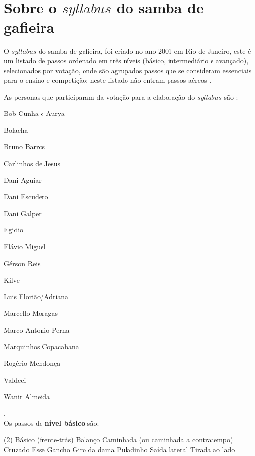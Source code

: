\section{Sobre o $syllabus$ do samba de gafieira}

O $syllabus$  do samba de gafieira, foi criado no ano 2001 em Rio de Janeiro,
este é um listado de passos ordenado em três níveis (básico, intermediário e avançado),
selecionados por votação,
onde são agrupados passos que se consideram essenciais para o ensino e competição;
neste listado não entram passos aéreos \cite[pp. 144]{perna2002samba}.


As personas que participaram da votação para a elaboração do $syllabus$ são \cite[pp. 144]{perna2002samba}:
\begin{inparaitem}[$*$]
\item Bob Cunha e Aurya
\item Bolacha
\item Bruno Barros
\item Carlinhos de Jesus
\item Dani Aguiar
\item Dani Escudero
\item Dani Galper
\item Egídio
\item Flávio Miguel
\item Gérson Reis
\item Kilve
\item Luis Florião/Adriana
\item Marcello Moragas
\item Marco Antonio Perna
\item Marquinhos Copacabana
\item Rogério Mendonça
\item Valdeci
\item Wanir Almeida
\end{inparaitem}.\\



Os passos de \textbf{nível básico} são:
\begin{tasks}(2)
\task Básico (frente-trás)
\task Balanço 
\task Caminhada (ou caminhada a contratempo)
\task Cruzado
\task Esse
\task Gancho
\task Giro da dama
\task Puladinho
\task Saída lateral
\task Tirada ao lado
\end{tasks}~\\


